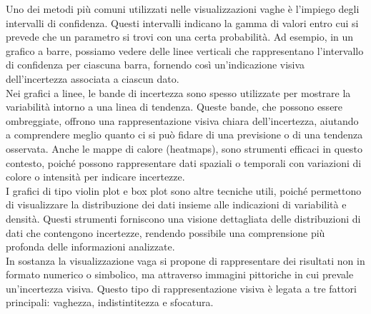 Uno dei metodi più comuni utilizzati nelle visualizzazioni vaghe è l'impiego degli intervalli di confidenza. Questi intervalli indicano la gamma di valori entro cui si prevede che un parametro si trovi con una certa probabilità. Ad esempio, in un grafico a barre, possiamo vedere delle linee verticali che rappresentano l'intervallo di confidenza per ciascuna barra, fornendo così un'indicazione visiva dell'incertezza associata a ciascun dato.\\
Nei grafici a linee, le bande di incertezza sono spesso utilizzate per mostrare la variabilità intorno a una linea di tendenza. Queste bande, che possono essere ombreggiate, offrono una rappresentazione visiva chiara dell'incertezza, aiutando a comprendere meglio quanto ci si può fidare di una previsione o di una tendenza osservata. Anche le mappe di calore (heatmaps), sono strumenti efficaci in questo contesto, poiché possono rappresentare dati spaziali o temporali con variazioni di colore o intensità per indicare incertezze.\\
I grafici di tipo violin plot e box plot sono altre tecniche utili, poiché permettono di visualizzare la distribuzione dei dati insieme alle indicazioni di variabilità e densità. Questi strumenti forniscono una visione dettagliata delle distribuzioni di dati che contengono incertezze, rendendo possibile una comprensione più profonda delle informazioni analizzate.\\
In sostanza la visualizzazione vaga si propone di rappresentare dei risultati non in formato numerico o simbolico, ma attraverso immagini pittoriche in cui prevale un'incertezza visiva. Questo tipo di rappresentazione visiva è legata a tre fattori principali: vaghezza, indistintitezza e sfocatura. \\

